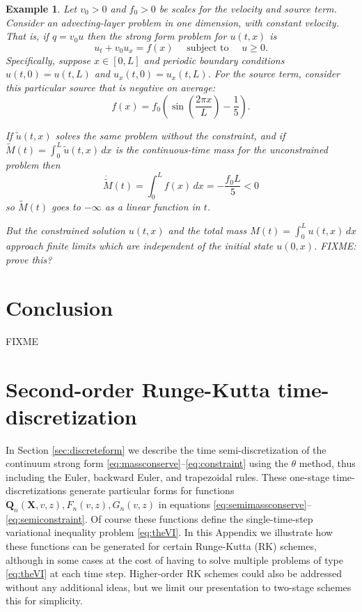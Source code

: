 \documentclass[final,leqno,onefignum,onetabnum]{siamltex1213bueler}
\newtheorem{example}{Example}
\newcommand\bQ{\mathbf{Q}}
\newcommand\bX{\mathbf{X}}
\begin{document}
\begin{example}  Let $v_0>0$ and $f_0>0$ be scales for the velocity and source term.  Consider an advecting-layer problem in one dimension, with constant velocity.  That is, if $q = v_0 u$ then the strong form problem for $u(t,x)$ is
\begin{equation}
u_t + v_0 u_x = f(x) \quad \text{ subject to } \quad u\ge 0.  \label{eq:ex:advectlayer}
\end{equation}
Specifically, suppose $x\in[0,L]$ and periodic boundary conditions $u(t,0)=u(t,L)$ and $u_x(t,0)=u_x(t,L)$.  For the source term, consider this particular source that is negative on average:
    $$f(x) = f_0 \left(\sin\left(\frac{2\pi x}{L}\right) - \frac{1}{5}\right).$$

If $\tilde u(t,x)$ solves the same problem without the constraint, and if $\tilde M(t) = \int_0^L \tilde u(t,x)\,dx$ is the continuous-time mass for the unconstrained problem then
    $$\dot{\tilde M}(t) = \int_0^L f(x)\,dx = -\frac{f_0 L}{5} < 0$$
so $\tilde M(t)$ goes to $-\infty$ as a linear function in $t$.

But the constrained solution $u(t,x)$ and the total mass $M(t) = \int_0^L u(t,x)\,dx$ approach finite limits which are independent of the initial state $u(0,x)$.  FIXME: prove this?
\end{example}

\section{Conclusion} \label{sec:conclusion}  FIXME






\Appendix

\section{Second-order Runge-Kutta time-discretization}   In Section \ref{sec:discreteform} we describe the time semi-discretization of the continuum strong form \eqref{eq:massconserve}--\eqref{eq:constraint} using the $\theta$ method, thus including the Euler, backward Euler, and trapezoidal rules.  These one-stage time-discretizations generate particular forms for functions $\bQ_n(\bX,v,z),F_n(v,z),G_n(v,z)$ in equations \eqref{eq:semimassconserve}--\eqref{eq:semiconstraint}.  Of course these functions define the single-time-step variational inequality problem \eqref{eq:theVI}.  In this Appendix we illustrate how these functions can be generated for certain Runge-Kutta (RK) schemes, although in some cases at the cost of having to solve multiple problems of type \eqref{eq:theVI} at each time step.  Higher-order RK schemes could also be addressed without any additional ideas, but we limit our presentation to two-stage schemes this for simplicity.
\end{document}
